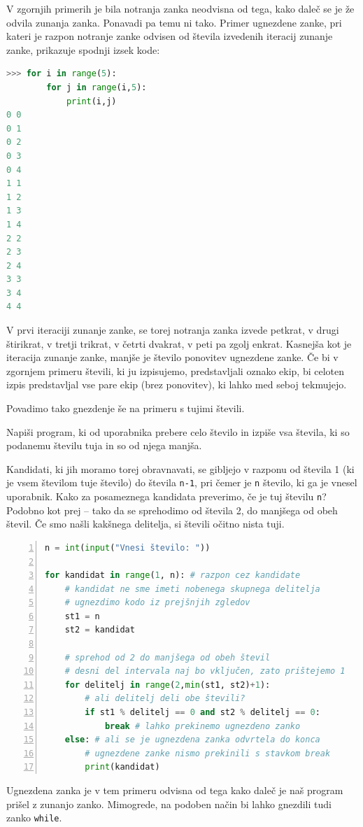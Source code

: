 V zgornjih primerih je bila notranja zanka neodvisna od tega, kako daleč se je že odvila zunanja zanka. Ponavadi pa temu ni tako. Primer ugnezdene zanke, pri kateri je razpon notranje zanke odvisen od števila izvedenih iteracij zunanje zanke, prikazuje spodnji izsek kode:
\begin{lstlisting}[language=Python]
>>> for i in range(5):
        for j in range(i,5):
            print(i,j)
0 0
0 1
0 2
0 3
0 4
1 1
1 2
1 3
1 4
2 2
2 3
2 4
3 3
3 4
4 4
\end{lstlisting}
V prvi iteraciji zunanje zanke, se torej notranja zanka izvede petkrat, v drugi štirikrat, v tretji trikrat, v četrti dvakrat, v peti pa zgolj enkrat. Kasnejša kot je iteracija zunanje zanke, manjše je število ponovitev ugnezdene zanke. Če bi v zgornjem primeru števili, ki ju izpisujemo, predstavljali oznako ekip, bi celoten izpis predstavljal vse pare ekip (brez ponovitev), ki lahko med seboj tekmujejo. 

Povadimo tako gnezdenje še na primeru s tujimi števili.
\begin{zgled}
Napiši program, ki od uporabnika prebere celo število in izpiše vsa števila, ki so podanemu številu tuja in so od njega manjša. 
\end{zgled}
\begin{resitev}
Kandidati, ki jih moramo torej obravnavati, se gibljejo v razponu od števila 1 (ki je vsem številom tuje število) do števila \texttt{n-1}, pri čemer je \texttt{n} število, ki ga je vnesel uporabnik. Kako za posameznega kandidata preverimo, če je tuj številu \texttt{n}? Podobno kot prej -- tako da se sprehodimo od števila 2, do manjšega od obeh števil. Če smo našli kakšnega delitelja, si števili očitno nista tuji.
\begin{lstlisting}[language=Python,numbers=left]
n = int(input("Vnesi število: "))

for kandidat in range(1, n): # razpon cez kandidate
    # kandidat ne sme imeti nobenega skupnega delitelja
    # ugnezdimo kodo iz prejšnjih zgledov
    st1 = n
    st2 = kandidat
    
    # sprehod od 2 do manjšega od obeh števil
    # desni del intervala naj bo vključen, zato prištejemo 1
    for delitelj in range(2,min(st1, st2)+1):
        # ali delitelj deli obe števili?
        if st1 % delitelj == 0 and st2 % delitelj == 0:
            break # lahko prekinemo ugnezdeno zanko
    else: # ali se je ugnezdena zanka odvrtela do konca
        # ugnezdene zanke nismo prekinili s stavkom break
        print(kandidat)
\end{lstlisting}
\end{resitev}
Ugnezdena zanka je v tem primeru odvisna od tega kako daleč je naš program prišel z zunanjo zanko. Mimogrede, na podoben način bi lahko gnezdili tudi zanko \texttt{while}. 


